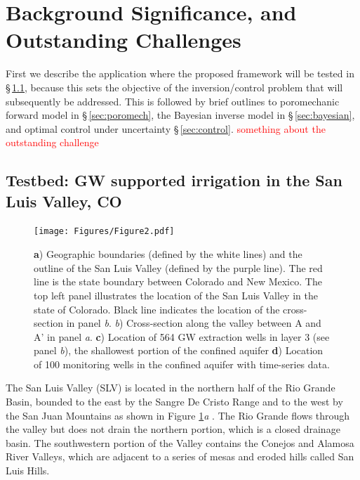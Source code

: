 \documentclass[11pt,final]{article}%
\newcommand{\note}[1]{\textcolor{red}{ #1}}
\renewcommand{\citep}{\cite}
\begin{document}
\section{Background Significance, and Outstanding Challenges}
First we describe the application where the proposed framework will be tested in \S\,\ref{sec:SLV}, because this sets the objective of the inversion/control problem that will subsequently be addressed. This is followed by brief outlines to poromechanic forward model in \S\,\ref{sec:poromech}, the Bayesian inverse model in \S\,\ref{sec:bayesian}, and optimal control under uncertainty \S\,\ref{sec:control}.
\note{something about the outstanding challenge}

\subsection{Testbed: GW supported irrigation in the San Luis Valley, CO}\label{sec:SLV}
\begin{figure}
\noindent\texttt{[image: Figures/Figure2.pdf]}
\caption{\textbf{a}) Geographic boundaries (defined by the white lines) and the outline of the San Luis Valley (defined by the purple line). The red line is the state boundary between Colorado and New Mexico. The top left panel illustrates the location of the San Luis Valley in the state of Colorado. Black line indicates the location of the cross-section in panel \emph{b}. \emph{b}) Cross-section along the valley between A and A' in panel \emph{a}. \textbf{c}) Location of 564 GW extraction wells in layer 3 (see panel \emph{b}), the shallowest portion of the confined aquifer  \textbf{d}) Location of 100 monitoring wells in the confined aquifer with time-series data.}
\label{fig:SLV}
\end{figure}
The San Luis Valley (SLV) is located in the northern half of the Rio Grande Basin, bounded to the east by the Sangre De Cristo Range and to the west by the San Juan Mountains as shown in Figure \ref{fig:SLV}\emph{a} \citep{SLV_report}. The Rio Grande flows through the valley but does not drain the northern portion, which is a closed drainage basin. The southwestern portion of the Valley contains the Conejos and Alamosa River Valleys, which are adjacent to a series of mesas and eroded hills called San Luis Hills.
\end{document}
